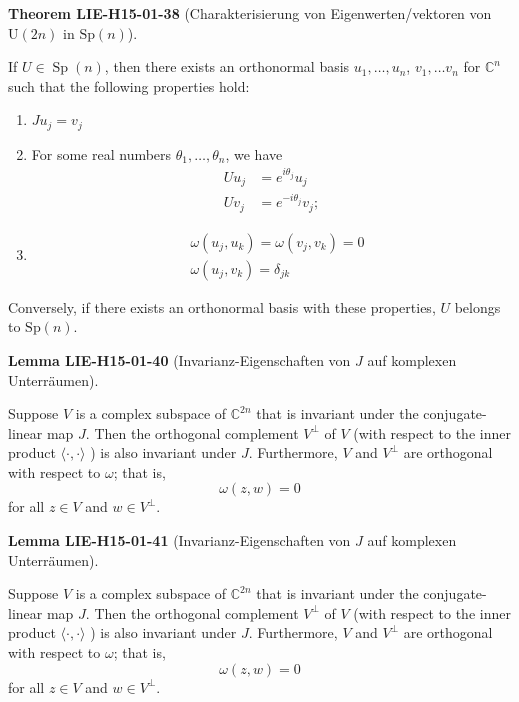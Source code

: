 \documentclass[10pt, letterpaper]{article}
\newcommand{\Sp}{\mathrm{Sp}}
\newcommand{\U}{\mathrm{U}}
\newcommand{\CustomHeading}[3]{%
  \par\medskip\noindent%
  \textbf{#1 #2} \textnormal{(#3)}.\enskip%
}
\newenvironment{THEO}[2]{\CustomHeading{Theorem}{#1}{#2}}{}
\newenvironment{LEM}[2]{\CustomHeading{Lemma}{#1}{#2}}{}
\begin{document}
\begin{THEO}{LIE-H15-01-38}{Charakterisierung von Eigenwerten/vektoren von $\U(2n)$ in $\Sp(n)$}
If $U \in \operatorname{Sp}(n)$, then there exists an orthonormal basis $u_{1}, \ldots, u_{n}$, $v_{1}, \ldots v_{n}$ for $\mathbb{C}^{n}$ such that the following properties hold: 

\begin{enumerate}
\item $J u_{j}=v_{j}$
\item For some real numbers $\theta_{1}, \ldots, \theta_{n}$, we have
$$
\begin{aligned}
U u_{j} & =e^{i \theta_{j}} u_{j} \\
U v_{j} & =e^{-i \theta_{j}} v_{j} ;
\end{aligned}
$$
\item $$
\begin{aligned}
& \omega\left(u_{j}, u_{k}\right)=\omega\left(v_{j}, v_{k}\right)=0 \\
& \omega\left(u_{j}, v_{k}\right)=\delta_{j k}
\end{aligned}
$$
\end{enumerate}
Conversely, if there exists an orthonormal basis with these properties, $U$ belongs to $\mathrm{Sp}(n)$.
\end{THEO}

\begin{LEM}{LIE-H15-01-40}{Invarianz-Eigenschaften von $J$ auf komplexen Unterräumen}
Suppose $V$ is a complex subspace of $\mathbb{C}^{2 n}$ that is invariant under the conjugate-linear map $J$. Then the orthogonal complement $V^{\perp}$ of $V$ (with respect to the inner product $\langle\cdot, \cdot\rangle$ ) is also invariant under $J$. Furthermore, $V$ and $V^{\perp}$ are orthogonal with respect to $\omega$; that is,
$$
\omega(z, w)=0
$$
for all $z \in V$ and $w \in V^{\perp}$.
\end{LEM}

\begin{LEM}{LIE-H15-01-41}{Invarianz-Eigenschaften von $J$ auf komplexen Unterräumen}
Suppose $V$ is a complex subspace of $\mathbb{C}^{2 n}$ that is invariant under the conjugate-linear map $J$. Then the orthogonal complement $V^{\perp}$ of $V$ (with respect to the inner product $\langle\cdot, \cdot\rangle$ ) is also invariant under $J$. Furthermore, $V$ and $V^{\perp}$ are orthogonal with respect to $\omega$; that is,
$$
\omega(z, w)=0
$$
for all $z \in V$ and $w \in V^{\perp}$.
\end{LEM}
\end{document}
